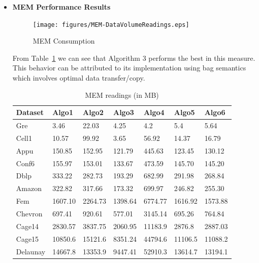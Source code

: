 \begin{itemize}
\item
\textbf{MEM Performance Results}
\begin{figure}[t]
    \centering
    \texttt{[image: figures/MEM-DataVolumeReadings.eps]}
    \caption{MEM Consumption}
    \label{fig:MEM Consumption}
\end{figure}
From Table~\ref{tab:Table3} we can see that Algorithm 3 performs the
best in this measure.  This behavior can be attributed to its
implementation using bag semantics which involves optimal data
transfer/copy.
\begin{table}[th]
\begin{center}
    \begin{tabular}{| l | l | l | l | l | l | l |}
    \hline
	Dataset & Algo1 & Algo2 & Algo3 & Algo4 & Algo5 & Algo6\\ \hline
    \hline
	Gre & \cellcolor{blue!25}3.46 & 22.03 & 4.25 & 4.2 & 5.4 & 5.64 \\ \hline
	Cell1 & 10.57 & 99.92 & \cellcolor{blue!25}3.65 & 56.92 & 14.37 & 16.79\\ \hline
	Appu & 150.85 & 152.95 & \cellcolor{blue!25}121.79 & 445.63 & 123.45 & 130.12\\ \hline
	Conf6 & 155.97 & 153.01 & \cellcolor{blue!25}133.67 & 473.59 & 145.70 & 145.20\\ \hline
	Dblp & 333.22 & 282.73 & \cellcolor{blue!25}193.29 & 682.99 & 291.98 & 268.84\\ \hline
	Amazon & 322.82 & 317.66 & \cellcolor{blue!25}173.32 & 699.97 & 246.82 & 255.30\\ \hline
	Fem & 1607.10 & 2264.73 & \cellcolor{blue!25}1398.64 & 6774.77 & 1616.92 & 1573.88\\ \hline
	Chevron & 697.41 & 920.61 & \cellcolor{blue!25}577.01 & 3145.14 & 695.26 & 764.84\\ \hline
	Cage14 & 2830.57 & 3837.75 & \cellcolor{blue!25}2060.95 & 11183.9 & 2876.8 & 2887.03\\ \hline
	Cage15 & 10850.6 & 15121.6 & \cellcolor{blue!25}8351.24 & 44794.6 & 11106.5 & 11088.2\\ \hline
	Delaunay & 14667.8 & 13353.9 & \cellcolor{blue!25}9447.41 & 52910.3 & 13614.7 & 13194.1\\ \hline
    \end{tabular}
\end{center}
\caption{\capfont MEM readings (in MB)}
\label{tab:Table3}
\end{table}


\end{itemize}
